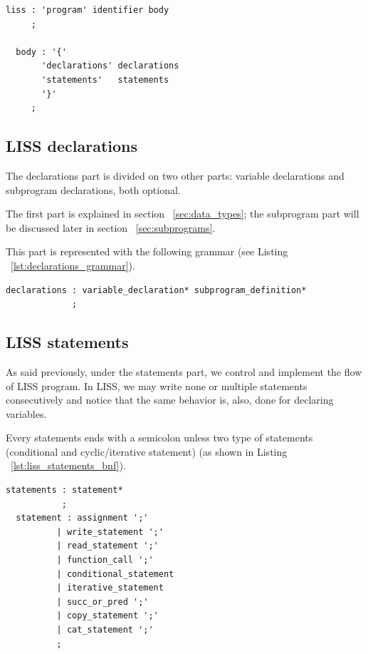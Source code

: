 \documentclass[
  oneside,
  11pt, a4paper,
  footinclude=true,
  headinclude=true,
  cleardoublepage=empty
]{scrbook}
\begin{document}
\begin{lstlisting}[caption={BNF of program in LISS},label={lst:program_grammar}]
  liss : 'program' identifier body
     ;

  body : '{'
       'declarations' declarations
       'statements'   statements
       '}'
     ;
\end{lstlisting}


\subsection{LISS declarations}
The declarations part is divided on two other parts: variable declarations and subprogram declarations, both optional.

The first part is explained in section ~\ref{sec:data_types}; the subprogram part will be discussed later in section ~\ref{sec:subprograms}.

This part is represented with the following grammar (see Listing ~\ref{lst:declarations_grammar}).

\begin{lstlisting}[caption={BNF of declarations in LISS},label={lst:declarations_grammar}]
  declarations : variable_declaration* subprogram_definition*
             ;
\end{lstlisting}

\subsection{LISS statements}

As said previously, under the statements part, we control and implement the flow of LISS program.
In LISS, we may write none or multiple statements consecutively and notice that the same behavior is, also, done for declaring variables.

Every statements ends with a semicolon unless two type of statements (conditional and cyclic/iterative statement) (as shown in Listing ~\ref{lst:liss_statements_bnf}).

\begin{lstlisting}[caption={BNF of statements in LISS},label={lst:liss_statements_bnf}]
  statements : statement*
           ;
  statement : assignment ';'
          | write_statement ';'
          | read_statement ';'
          | function_call ';'
          | conditional_statement
          | iterative_statement
          | succ_or_pred ';'
          | copy_statement ';'
          | cat_statement ';'
          ;
\end{lstlisting}
\end{document}
